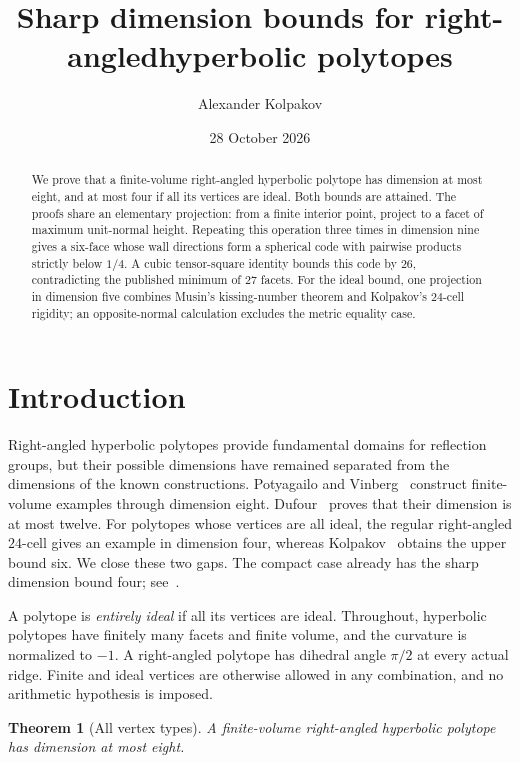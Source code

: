 \documentclass[11pt]{article}
\title{Sharp dimension bounds for right-angled\linebreak hyperbolic polytopes}
\author{Alexander Kolpakov}
\date{28 October 2026}
\newtheorem{theorem}{Theorem}
\theoremstyle{remark}
\begin{document}
\maketitle
\begin{abstract}
We prove that a finite-volume right-angled hyperbolic polytope has
dimension at most eight, and at most four if all its vertices are ideal.
Both bounds are attained. The proofs share an elementary projection:
from a finite interior point, project to a facet of maximum unit-normal
height. Repeating this operation three times in dimension nine gives
a six-face whose wall directions form a spherical code with pairwise
products strictly below $1/4$. A cubic tensor-square identity bounds
this code by $26$, contradicting the published minimum of $27$ facets.
For the ideal bound, one projection in dimension five combines
Musin's kissing-number theorem and Kolpakov's $24$-cell rigidity;
an opposite-normal calculation excludes the metric equality case.
\end{abstract}

\section{Introduction}

Right-angled hyperbolic polytopes provide fundamental domains for
reflection groups, but their possible dimensions have remained separated
from the dimensions of the known constructions. Potyagailo and
Vinberg~\cite{PV} construct finite-volume examples through dimension
eight. Dufour~\cite{Dufour} proves that their dimension is at most
twelve. For polytopes whose vertices are all ideal, the regular
right-angled $24$-cell gives an example in dimension four, whereas
Kolpakov~\cite[Corollary~7]{Kolpakov} obtains the upper bound six.
We close these two gaps. The compact case already has the sharp
dimension bound four; see~\cite[Section~2]{PV}.

A polytope is \emph{entirely ideal} if all its vertices are ideal.
Throughout, hyperbolic polytopes have finitely many facets and finite
volume, and the curvature is normalized to $-1$.
A right-angled polytope has dihedral angle $\pi/2$ at every
actual ridge. Finite and ideal vertices are otherwise allowed in any
combination, and no arithmetic hypothesis is imposed.

\begin{theorem}[All vertex types]\label{thm:general}
A finite-volume right-angled hyperbolic polytope has dimension at
most eight.
\end{theorem}
\end{document}
